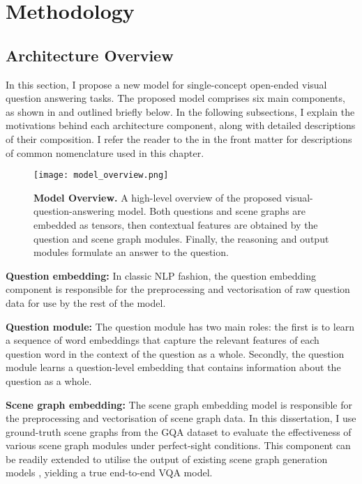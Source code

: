\chapter{Methodology}
\label{chapter:methodology}

\section{Architecture Overview}
\label{section:architecture_overview}

In this section, I propose a new model for single-concept open-ended visual question answering tasks. The proposed model comprises six main components, as shown in \figureautorefname{ \ref{fig:model_overview}} and outlined briefly below. In the following subsections, I explain the motivations behind each architecture component, along with detailed descriptions of their composition. I refer the reader to the  in the front matter for descriptions of common nomenclature used in this chapter.


\begin{figure}[htbp]
    \centering
    \texttt{[image: model\_overview.png]}
    \caption[An overview of the proposed visual-question-answering model.]{\textbf{Model Overview.} A high-level overview of the proposed visual-question-answering model. Both questions and scene graphs are embedded as tensors, then contextual features are obtained by the question and scene graph modules. Finally, the reasoning and output modules formulate an answer to the question.}
    \label{fig:model_overview}
\end{figure}

\textbf{Question embedding:} In classic NLP fashion, the question embedding component is responsible for the preprocessing and vectorisation of raw question data for use by the rest of the model.

\textbf{Question module:} The question module has two main roles: the first is to learn a sequence of word embeddings that capture the relevant features of each question word in the context of the question as a whole. Secondly, the question module learns a question-level embedding that contains information about the question as a whole.

\textbf{Scene graph embedding:} The scene graph embedding model is responsible for the preprocessing and vectorisation of scene graph data. In this dissertation, I use ground-truth scene graphs from the GQA dataset to evaluate the effectiveness of various scene graph modules under perfect-sight conditions. This component can be readily extended to utilise the output of existing scene graph generation models \cite{yang2018graph, li2019relation}, yielding a true end-to-end VQA model.

